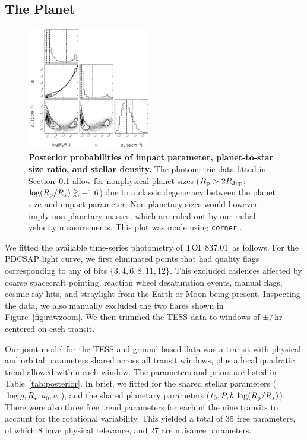 \documentclass[12pt,twocolumn,tighten]{aastex63}
\newcommand{\pn}{TOI~837.01} %
\begin{document}
\subsection{The Planet}
\label{subsec:planet}



\begin{figure}[!t]
	\begin{center}
		\leavevmode
		\includegraphics[width=0.48\textwidth]{f10.png}
	\end{center}
	\vspace{-0.5cm}
	\caption{ 
		{\bf Posterior probabilities of
			impact parameter, planet-to-star size ratio, and stellar density.} The photometric
		data fitted in Section~\ref{subsec:planet} allow for
		nonphysical planet sizes ($R_{\rm p}>2R_{\rm Jup}$;
		$\log(R_{\rm p}/R_\star) \gtrsim -1.6$) due to a classic degeneracy
		between the planet size and impact parameter.  Non-planetary sizes
		would however imply non-planetary masses, which are ruled out by our
		radial velocity measurements.
		This plot was made using \texttt{corner} \citep{corner_2016}.
		\label{fig:subsetcorner}
	}
\end{figure}


We fitted the available time-series photometry of \pn\ as follows.
For the PDCSAP light curve, we first eliminated points that had
quality flags corresponding to any of bits $\{3, 4, 6, 8, 11, 12\}$.
This excluded cadences affected by coarse spacecraft pointing,
reaction wheel desaturation events, manual flags, cosmic ray hits, and
straylight from the Earth or Moon being present.  Inspecting the data,
we also manually excluded the two flares shown in
Figure~\ref{fig:rawzoom}.  We then trimmed the TESS data to windows of
$\pm 7\,{\rm hr}$ centered on each transit.

Our joint model for the TESS and ground-based data was a
\citet{exoplanet:agol19} transit with physical and orbital parameters
shared across all transit windows, plus a local quadratic trend
allowed within each window.  The parameters and priors
are listed in Table~\ref{tab:posterior}.  In brief, we fitted for the
shared stellar parameters ($\log g, R_\star, u_0, u_1$), and the
shared planetary parameters ($t_0, P, b, \log(R_{\rm p}/R_\star)$).
There were also three free trend parameters for each of the nine
transits to account for the rotational variability.  This yielded a
total of 35 free parameters, of which 8 have physical relevance, and
27 are nuisance parameters.
\end{document}
